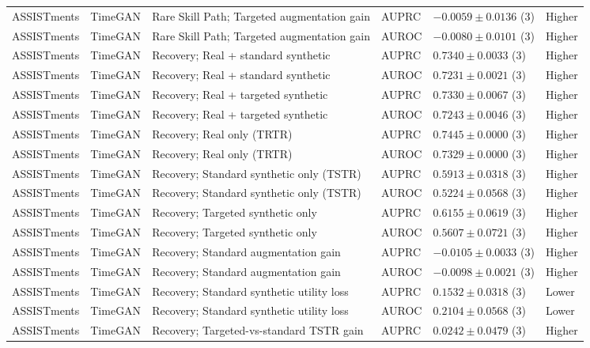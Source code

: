 \begin{longtable}{@{}p{2.25cm}p{2.05cm}p{4.7cm}p{5.0cm}p{2.6cm}p{1.25cm}@{}}
ASSISTments & TimeGAN & Rare Skill Path; Targeted augmentation gain & AUPRC & $-0.0059 \mathbin{\pm} 0.0136$ (3) & Higher \\
ASSISTments & TimeGAN & Rare Skill Path; Targeted augmentation gain & AUROC & $-0.0080 \mathbin{\pm} 0.0101$ (3) & Higher \\
ASSISTments & TimeGAN & Recovery; Real + standard synthetic & AUPRC & $0.7340 \mathbin{\pm} 0.0033$ (3) & Higher \\
ASSISTments & TimeGAN & Recovery; Real + standard synthetic & AUROC & $0.7231 \mathbin{\pm} 0.0021$ (3) & Higher \\
ASSISTments & TimeGAN & Recovery; Real + targeted synthetic & AUPRC & $0.7330 \mathbin{\pm} 0.0067$ (3) & Higher \\
ASSISTments & TimeGAN & Recovery; Real + targeted synthetic & AUROC & $0.7243 \mathbin{\pm} 0.0046$ (3) & Higher \\
ASSISTments & TimeGAN & Recovery; Real only (TRTR) & AUPRC & $0.7445 \mathbin{\pm} 0.0000$ (3) & Higher \\
ASSISTments & TimeGAN & Recovery; Real only (TRTR) & AUROC & $0.7329 \mathbin{\pm} 0.0000$ (3) & Higher \\
ASSISTments & TimeGAN & Recovery; Standard synthetic only (TSTR) & AUPRC & $0.5913 \mathbin{\pm} 0.0318$ (3) & Higher \\
ASSISTments & TimeGAN & Recovery; Standard synthetic only (TSTR) & AUROC & $0.5224 \mathbin{\pm} 0.0568$ (3) & Higher \\
ASSISTments & TimeGAN & Recovery; Targeted synthetic only & AUPRC & $0.6155 \mathbin{\pm} 0.0619$ (3) & Higher \\
ASSISTments & TimeGAN & Recovery; Targeted synthetic only & AUROC & $0.5607 \mathbin{\pm} 0.0721$ (3) & Higher \\
ASSISTments & TimeGAN & Recovery; Standard augmentation gain & AUPRC & $-0.0105 \mathbin{\pm} 0.0033$ (3) & Higher \\
ASSISTments & TimeGAN & Recovery; Standard augmentation gain & AUROC & $-0.0098 \mathbin{\pm} 0.0021$ (3) & Higher \\
ASSISTments & TimeGAN & Recovery; Standard synthetic utility loss & AUPRC & $0.1532 \mathbin{\pm} 0.0318$ (3) & Lower \\
ASSISTments & TimeGAN & Recovery; Standard synthetic utility loss & AUROC & $0.2104 \mathbin{\pm} 0.0568$ (3) & Lower \\
ASSISTments & TimeGAN & Recovery; Targeted-vs-standard TSTR gain & AUPRC & $0.0242 \mathbin{\pm} 0.0479$ (3) & Higher \\

\end{longtable}
